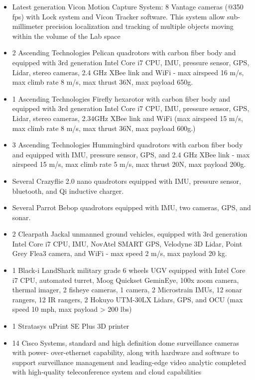 \begin{description}
\begin{itemize}
    \item Latest generation Vicon Motion Capture System: 8 Vantage cameras (@350 fps) with Lock system and Vicon Tracker software. This system allow sub-millimeter precision localization and tracking of multiple objects moving within the volume of the Lab space
    \item 2 Ascending Technologies Pelican quadrotors with carbon ﬁber body and equipped with 3rd generation Intel Core i7 CPU, IMU, pressure sensor, GPS, Lidar, stereo cameras, 2.4 GHz XBee link and WiFi - max airspeed 16 m/s, max climb rate 8 m/s, max thrust 36N, max payload 650g.
    \item 1 Ascending Technologies Fireﬂy hexarotor with carbon ﬁber body and equipped with 3rd generation Intel Core i7 CPU, IMU, pressure sensor, GPS, Lidar, stereo cameras, 2.34GHz XBee link and WiFi (max airspeed 15 m/s, max climb rate 8 m/s, max thrust 36N, max payload 600g.)
    \item 3 Ascending Technologies Hummingbird quadrotors with carbon ﬁber body and equipped with IMU, pressure sensor, GPS, and 2.4 GHz XBee link - max airspeed 15 m/s, max climb rate 5 m/s, max thrust 20N, max payload 200g.
    \item Several Crazyﬂie 2.0 nano quadrotors equipped with IMU, pressure sensor, bluetooth, and Qi inductive charger.
    \item Several Parrot Bebop quadrotors equipped with IMU, two cameras, GPS, and sonar.
    \item 2 Clearpath Jackal unmanned ground vehicles, equipped with 3rd generation Intel Core i7 CPU, IMU, NovAtel SMART GPS, Velodyne 3D Lidar, Point Grey Flea3 camera, and WiFi - max speed 2 m/s, max payload 20 kg.
    \item 1 Black-i LandShark military grade 6 wheels UGV equipped with Intel Core i7 CPU, automated turret, Moog Quickset GeminEye, 100x zoom camera, thermal imager, 2 ﬁsheye cameras, 1 camera, 2 Microstrain IMUs, 12 sonar rangers, 12 IR rangers, 2 Hokuyo UTM-30LX Lidars, GPS, and OCU (max speed 10 mph, max payload > 200 lbs)
    \item 1 Stratasys uPrint SE Plus 3D printer
    \item 14 Cisco Systems, standard and high deﬁnition dome surveillance cameras with power- over-ethernet capability, along with hardware and software to support surveillance management and leading-edge video analytic completed with high-quality teleconference system and cloud capabilities
\end{itemize}


\end{description}
